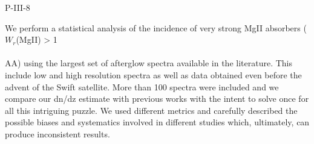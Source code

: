 P-III-8


\bigskip



\bigskip

\noindent We perform a statistical analysis of the incidence of very strong  MgII absorbers ($W_r$(MgII) > 1 \\\\AA) using the largest set of afterglow spectra available in the literature. This include low and high resolution spectra as well as data obtained even before the advent of the Swift satellite. More than 100 spectra were included and we compare our dn/dz estimate with previous works with the intent to solve once for all this intriguing puzzle. We used different metrics and  carefully described the possible biases and systematics involved in different studies which, ultimately, can produce inconsistent results.
